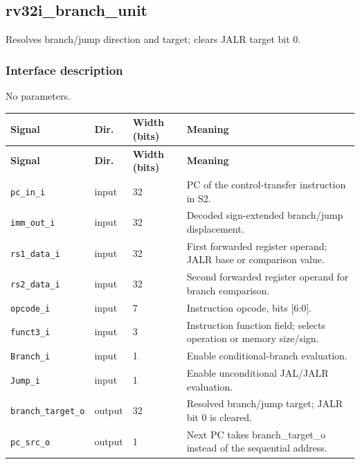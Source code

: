 \documentclass[11pt]{article}
\begin{document}
\subsection{rv32i\_branch\_unit}
Resolves branch/jump direction and target; clears JALR target bit 0.
\subsubsection{Interface description}
\noindent No parameters.\par\medskip
{\small
\begin{longtable}{@{}L{0.3400\dimexpr\linewidth-36pt\relax}L{0.1000\dimexpr\linewidth-36pt\relax}L{0.1000\dimexpr\linewidth-36pt\relax}L{0.4600\dimexpr\linewidth-36pt\relax}@{}}
\toprule
\textbf{Signal} & \textbf{Dir.} & \textbf{Width (bits)} & \textbf{Meaning} \\ \midrule
\endfirsthead
\toprule
\textbf{Signal} & \textbf{Dir.} & \textbf{Width (bits)} & \textbf{Meaning} \\ \midrule
\endhead
\texttt{pc\_in\_i} & input & 32 & PC of the control-transfer instruction in S2. \\ \addlinespace[3pt]
\texttt{imm\_out\_i} & input & 32 & Decoded sign-extended branch/jump displacement. \\ \addlinespace[3pt]
\texttt{rs1\_data\_i} & input & 32 & First forwarded register operand; JALR base or comparison value. \\ \addlinespace[3pt]
\texttt{rs2\_data\_i} & input & 32 & Second forwarded register operand for branch comparison. \\ \addlinespace[3pt]
\texttt{opcode\_i} & input & 7 & Instruction opcode, bits [6:0]. \\ \addlinespace[3pt]
\texttt{funct3\_i} & input & 3 & Instruction function field; selects operation or memory size/sign. \\ \addlinespace[3pt]
\texttt{Branch\_i} & input & 1 & Enable conditional-branch evaluation. \\ \addlinespace[3pt]
\texttt{Jump\_i} & input & 1 & Enable unconditional JAL/JALR evaluation. \\ \addlinespace[3pt]
\texttt{branch\_target\_o} & output & 32 & Resolved branch/jump target; JALR bit 0 is cleared. \\ \addlinespace[3pt]
\texttt{pc\_src\_o} & output & 1 & Next PC takes branch\_target\_o instead of the sequential address. \\*
\bottomrule\end{longtable}}
\end{document}
